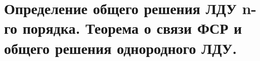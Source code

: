 {
	\section{Определение общего решения ЛДУ n-го порядка. Теорема о связи ФСР и общего решения однородного ЛДУ.}

	\newpage
}